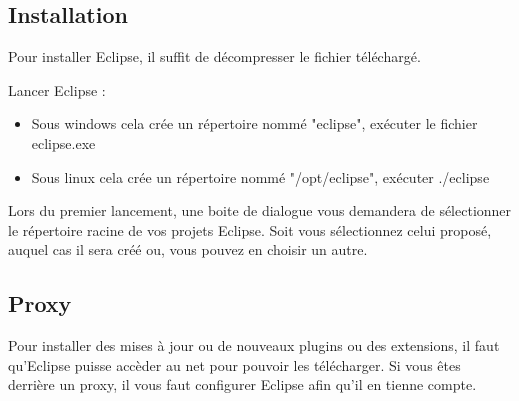 \medskip

\subsection{Installation}
Pour installer Eclipse, il suffit de décompresser le fichier téléchargé. 

\bigskip

\noindent
Lancer Eclipse :
\begin{itemize}
\item Sous windows cela crée un répertoire nommé "eclipse", exécuter le fichier eclipse.exe
\item Sous linux cela crée un répertoire nommé "/opt/eclipse", exécuter ./eclipse
\end{itemize}

\noindent
Lors du premier lancement, une boite de dialogue vous demandera de sélectionner le répertoire racine de vos projets Eclipse. Soit vous sélectionnez celui proposé, auquel cas il sera créé ou, vous pouvez en choisir un autre.

\newpage


\subsection{Proxy}

Pour installer des mises à jour ou de nouveaux plugins ou des extensions, il faut qu'Eclipse puisse accèder au net pour pouvoir les télécharger.  Si vous êtes derrière un proxy, il vous faut configurer Eclipse afin qu'il en tienne compte.

\bigskip


